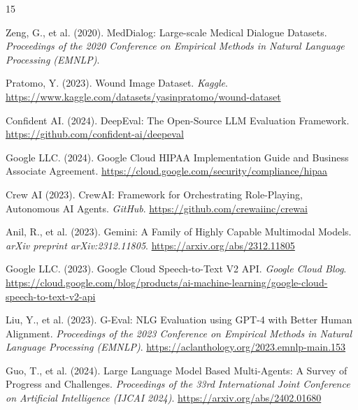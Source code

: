 \documentclass[sigplan,screen]{acmart}
\begin{document}

\begin{thebibliography}{15}

Zeng, G., et al. (2020).
\newblock MedDialog: Large-scale Medical Dialogue Datasets.
\newblock \emph{Proceedings of the 2020 Conference on Empirical Methods in Natural Language Processing (EMNLP)}.

Pratomo, Y. (2023).
\newblock Wound Image Dataset.
\newblock \emph{Kaggle}. \url{https://www.kaggle.com/datasets/yasinpratomo/wound-dataset}

Confident AI. (2024).
\newblock DeepEval: The Open-Source LLM Evaluation Framework.
\newblock \url{https://github.com/confident-ai/deepeval}

Google LLC. (2024).
\newblock Google Cloud HIPAA Implementation Guide and Business Associate Agreement.
\newblock \url{https://cloud.google.com/security/compliance/hipaa}


Crew AI (2023).
\newblock CrewAI: Framework for Orchestrating Role-Playing, Autonomous AI Agents.
\newblock \emph{GitHub}. \url{https://github.com/crewaiinc/crewai}

Anil, R., et al. (2023).
\newblock Gemini: A Family of Highly Capable Multimodal Models.
\newblock \emph{arXiv preprint arXiv:2312.11805}. \url{https://arxiv.org/abs/2312.11805}

Google LLC. (2023).
\newblock Google Cloud Speech-to-Text V2 API.
\newblock \emph{Google Cloud Blog}. \url{https://cloud.google.com/blog/products/ai-machine-learning/google-cloud-speech-to-text-v2-api}

Liu, Y., et al. (2023).
\newblock G-Eval: NLG Evaluation using GPT-4 with Better Human Alignment.
\newblock \emph{Proceedings of the 2023 Conference on Empirical Methods in Natural Language Processing (EMNLP)}.
\newblock \url{https://aclanthology.org/2023.emnlp-main.153}


Guo, T., et al. (2024).
\newblock Large Language Model Based Multi-Agents: A Survey of Progress and Challenges.
\newblock \emph{Proceedings of the 33rd International Joint Conference on Artificial Intelligence (IJCAI 2024)}.
\newblock \url{https://arxiv.org/abs/2402.01680}

\end{thebibliography}
\end{document}
